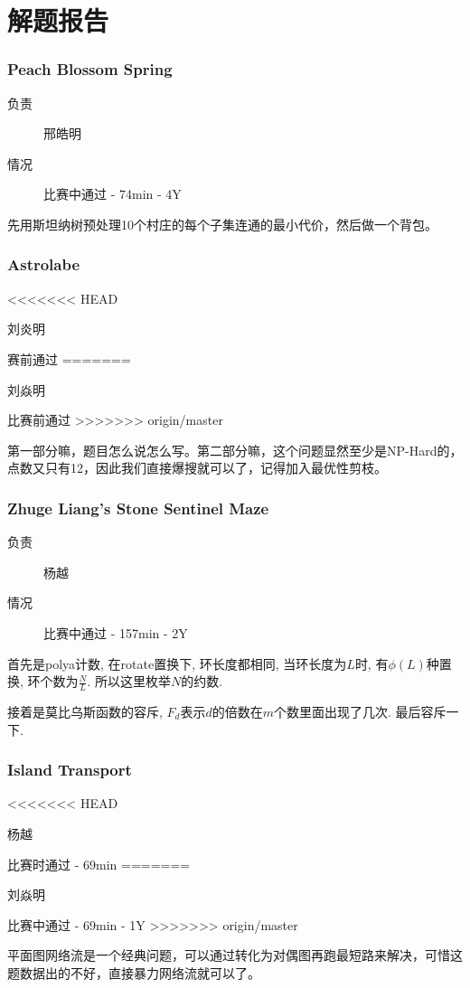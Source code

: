 \documentclass[a4paper, 11pt, nofonts, nocap, fancyhdr]{ctexart}
\newcommand{\problem}[1]{\subsubsection{#1}}
\begin{document}
\section{解题报告}


\problem{Peach Blossom Spring}

\begin{description}
\item[负责] 邢皓明
\item[情况] 比赛中通过 - 74min - 4Y
\end{description}

先用斯坦纳树预处理10个村庄的每个子集连通的最小代价，然后做一个背包。

\problem{Astrolabe}

\begin{description}
<<<<<<< HEAD
\item[负责] 刘炎明
\item[情况] 赛前通过
=======
\item[负责] 刘焱明
\item[情况] 比赛前通过
>>>>>>> origin/master
\end{description}

第一部分嘛，题目怎么说怎么写。第二部分嘛，这个问题显然至少是NP-Hard的，点数又只有12，因此我们直接爆搜就可以了，记得加入最优性剪枝。

\problem{Zhuge Liang's Stone Sentinel Maze}

\begin{description}
\item[负责] 杨越
\item[情况] 比赛中通过 - 157min - 2Y
\end{description}

首先是polya计数, 在rotate置换下, 环长度都相同, 当环长度为$L$时, 有$\phi(L)$种置换, 环个数为$\frac{N}{L}$. 所以这里枚举$N$的约数.

接着是莫比乌斯函数的容斥, $F_d$表示$d$的倍数在$m$个数里面出现了几次. 最后容斥一下.

\problem{Island Transport}

\begin{description}
<<<<<<< HEAD
\item[负责] 杨越
\item[情况] 比赛时通过 - 69min
=======
\item[负责] 刘焱明
\item[情况] 比赛中通过 - 69min - 1Y
>>>>>>> origin/master
\end{description}

平面图网络流是一个经典问题，可以通过转化为对偶图再跑最短路来解决，可惜这题数据出的不好，直接暴力网络流就可以了。
\end{document}
